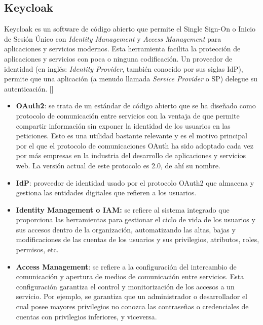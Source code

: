 \subsection{Keycloak}
Keycloak es un software de código abierto que permite el Single Sign-On o Inicio de Sesión Único con \textit{Identity Management} y \textit{Access Management} para aplicaciones y servicios modernos. Esta herramienta facilita la protección de aplicaciones y servicios con poca o ninguna codificación. Un proveedor de identidad (en inglés: \textit{Identity Provider}, también conocido por sus siglas IdP), permite que una aplicación (a menudo llamada \textit{Service Provider} o SP) delegue su autenticación. [\cite{KeycloakDoc}]

\begin{itemize}
	\item \textbf{OAuth2}: se trata de un estándar de código abierto que se ha diseñado como protocolo de comunicación entre servicios con la ventaja de que permite compartir información sin exponer la identidad de los usuarios en las peticiones. Esto es una utilidad bastante relevante y es el motivo principal por el que el protocolo de comunicaciones OAuth ha sido adoptado cada vez por más empresas en la industria del desarrollo de aplicaciones y servicios web. La versión actual de este protocolo es 2.0, de ahí su nombre.
	
	\item \textbf{IdP}: proveedor de identidad usado por el protocolo OAuth2 que almacena y gestiona las entidades digitales que refieren a los usuarios.
	
	\item \textbf{Identity Management o IAM: }se refiere al sistema integrado que proporciona las herramientas para gestionar el ciclo de vida de los usuarios y sus accesos dentro de la organización, automatizando las altas, bajas y modificaciones de las cuentas de los usuarios y sus privilegios, atributos, roles, permisos, etc.
	
	\item \textbf{Access Management}: se refiere a la configuración del intercambio de comunicación y apertura de medios de comunicación entre servicios. Esta configuración garantiza el control y monitorización de los accesos a un servicio. Por ejemplo, se garantiza que un administrador o desarrollador el cual posee mayores privilegios no conozca las contraseñas o credenciales de cuentas con privilegios inferiores, y viceversa. 
\end{itemize}

